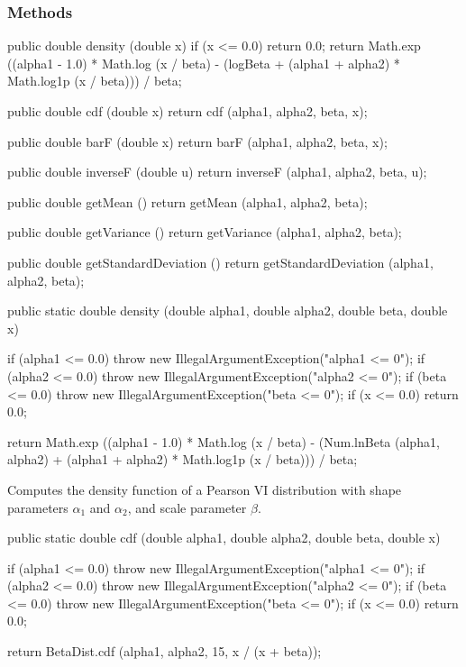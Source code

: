 \subsubsection* {Methods}
\begin{code}\begin{hide}

   public double density (double x) {
      if (x <= 0.0)
         return 0.0;
      return Math.exp ((alpha1 - 1.0) * Math.log (x / beta) - (logBeta +
            (alpha1 + alpha2) * Math.log1p (x / beta))) / beta;
   }

   public double cdf (double x) {
      return cdf (alpha1, alpha2, beta, x);
   }

   public double barF (double x) {
      return barF (alpha1, alpha2, beta, x);
   }

   public double inverseF (double u) {
      return inverseF (alpha1, alpha2, beta, u);
   }

   public double getMean () {
      return getMean (alpha1, alpha2, beta);
   }

   public double getVariance () {
      return getVariance (alpha1, alpha2, beta);
   }

   public double getStandardDeviation () {
      return getStandardDeviation (alpha1, alpha2, beta);
   }\end{hide}

   public static double density (double alpha1, double alpha2,
                                 double beta, double x)\begin{hide} {
      if (alpha1 <= 0.0)
         throw new IllegalArgumentException("alpha1 <= 0");
      if (alpha2 <= 0.0)
         throw new IllegalArgumentException("alpha2 <= 0");
      if (beta <= 0.0)
         throw new IllegalArgumentException("beta <= 0");
      if (x <= 0.0)
         return 0.0;

      return Math.exp ((alpha1 - 1.0) * Math.log (x / beta) -
         (Num.lnBeta (alpha1, alpha2) + (alpha1 + alpha2) * Math.log1p (x / beta))) / beta;
   }\end{hide}
\end{code}
\begin{tabb}
   Computes the density function of a Pearson VI distribution with shape
parameters $\alpha_1$
   and $\alpha_2$, and scale parameter $\beta$.
\end{tabb}
\begin{code}

   public static double cdf (double alpha1, double alpha2,
                             double beta, double x)\begin{hide} {
      if (alpha1 <= 0.0)
         throw new IllegalArgumentException("alpha1 <= 0");
      if (alpha2 <= 0.0)
         throw new IllegalArgumentException("alpha2 <= 0");
      if (beta <= 0.0)
         throw new IllegalArgumentException("beta <= 0");
      if (x <= 0.0)
         return 0.0;

      return BetaDist.cdf (alpha1, alpha2, 15, x / (x + beta));
   }\end{hide}
\end{code}
